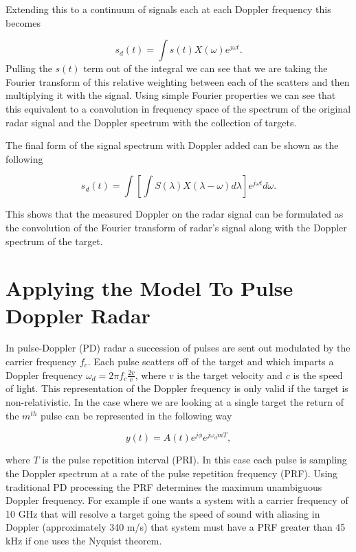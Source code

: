 \noindent Extending this to a continuum of signals each at each Doppler frequency this becomes

\begin{equation}
\label{conDop}
s_d(t) = \int s(t) X(\omega)e^{j\omega t}.
\end{equation}
\noindent Pulling the $s(t)$ term out of the integral we can see that we are taking the Fourier transform of this relative weighting between each of the scatters and then multiplying it with the signal.  Using simple Fourier properties we can see that this equivalent to a convolution in frequency space of the spectrum of the original radar signal and the Doppler spectrum with the collection of targets.  

The final form of the signal spectrum with Doppler added can be shown as the following

\begin{equation}
\label{finalDop}
s_d(t) = \int \left[\int S(\lambda)X(\lambda-\omega)d\lambda\right] e^{j\omega t}d\omega.
\end{equation}

\noindent This shows that the measured Doppler on the radar signal can be formulated as the convolution of the Fourier transform of radar's signal along with the Doppler spectrum of the target.

\section*{Applying the Model To Pulse Doppler Radar}

In pulse-Doppler (PD) radar a succession of pulses are sent out modulated by the carrier frequency $f_c$.  Each pulse scatters off of the target and which imparts a Doppler frequency $\omega_d = 2\pi f_c \frac{2v}{c}$, where $v$ is the target velocity and $c$ is the speed of light.  This representation of the Doppler frequency is only valid if the target is non-relativistic.  In the case where we are looking at a single target the return of the $m^{th}$ pulse can be represented in the following way\cite{richards:fundamentalsigproc}

\begin{equation}
\label{pdpulse}
y(t) =  A(t)e^{j\phi}e^{j\omega_dmT},
\end{equation}

\noindent where $T$ is the pulse repetition interval (PRI).  In this case each pulse is sampling the Doppler spectrum at a rate of the pulse repetition frequency (PRF).  Using traditional PD processing the PRF determines the maximum unambiguous Doppler frequency.  For example if one wants a system with a carrier frequency of 10 GHz that will resolve a target going the speed of sound with aliasing in Doppler (approximately 340 m/s) that system must have a PRF greater than 45 kHz if one uses the Nyquist theorem.   

